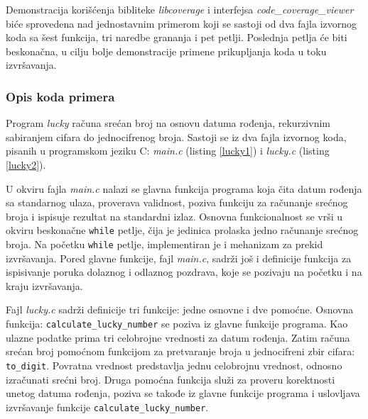 \documentclass[12pt,oneside]{memoir}
\newcommand{\kod}[1]{\texttt{#1}}
\newcommand{\strano}[1]{\textit{#1}}
\begin{document}
Demonstracija korišćenja bibliteke \strano{libcoverage} i interfejsa \strano{code\_coverage\_viewer} biće sprovedena nad jednostavnim primerom koji se sastoji od dva fajla izvornog koda sa šest funkcija, tri naredbe grananja i pet petlji. Poslednja petlja će biti beskonačna, u cilju bolje demonstracije primene prikupljanja koda u toku izvršavanja.
\\

\subsubsection{Opis koda primera}

Program \strano{lucky} računa srećan broj na osnovu datuma rođenja, rekurzivnim sabiranjem cifara do jednocifrenog broja. Sastoji se iz dva fajla izvornog koda, pisanih u programskom jeziku C: \strano{main.c} (listing \ref{lucky1}) i \strano{lucky.c} (listing \ref{lucky2}).

U okviru fajla \strano{main.c} nalazi se glavna funkcija programa koja čita datum rođenja sa standarnog ulaza, proverava validnost, poziva funkciju za računanje srećnog broja i ispisuje rezultat na standardni izlaz. Osnovna funkcionalnost se vrši u okviru beskonačne \kod{while} petlje, čija je jedinica prolaska jedno računanje srećnog broja. Na početku \kod{while} petlje, implementiran je i mehanizam za prekid izvršavanja. Pored glavne funkcije, fajl \strano{main.c}, sadrži još i definicije funkcija za ispisivanje poruka dolaznog i odlaznog pozdrava, koje se pozivaju na početku i na kraju izvršavanja.

Fajl \strano{lucky.c} sadrži definicije tri funkcije: jedne osnovne i dve pomoćne. Osnovna funkcija: \kod{calculate\_lucky\_number} se poziva iz glavne funkcije programa. Kao ulazne podatke prima tri celobrojne vrednosti za datum rođenja. Zatim računa srećan broj pomoćnom funkcijom za pretvaranje broja u jednocifreni zbir cifara: \kod{to\_digit}. Povratna vrednost predstavlja jednu celobrojnu vrednost, odnosno izračunati srećni broj. Druga pomoćna funkcija služi za proveru korektnosti unetog datuma rođenja, poziva se takođe iz glavne funkcije programa i uslovljava izvršavanje funkcije \kod{calculate\_lucky\_number}.
\\
\newpage
\end{document}
